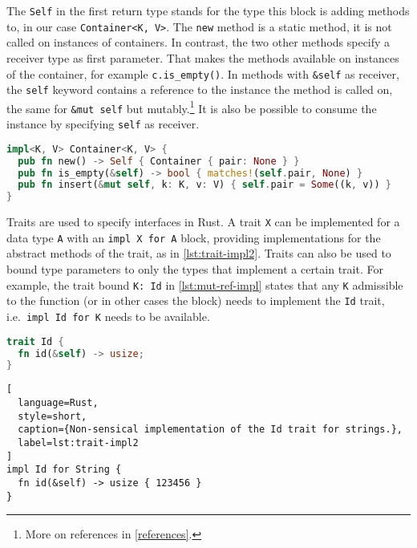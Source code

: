 The \lstinline!Self! in the first return type stands for the type this block is
adding methods to, in our case \lstinline!Container<K, V>!. The \lstinline!new!
method is a static method, it is not called on instances of containers. In
contrast, the two other methods specify a receiver type as first parameter. That
makes the methods available on instances of the container, for example
\lstinline!c.is_empty()!. In methods with \lstinline!&self! as receiver, the
\lstinline!self! keyword  contains a reference to the instance the method is
called on, the same for \lstinline!&mut self! but mutably.\footnote{More on
references in \autoref{references}.} It is also be possible to consume the
instance by specifying \lstinline!self! as receiver.

\begin{lstlisting}[language=Rust, caption={Methods for the running example}, label=lst:impl1]
impl<K, V> Container<K, V> {
  pub fn new() -> Self { Container { pair: None } }
  pub fn is_empty(&self) -> bool { matches!(self.pair, None) }
  pub fn insert(&mut self, k: K, v: V) { self.pair = Some((k, v)) }
}
\end{lstlisting}

Traits are used to specify interfaces in Rust. A trait \lstinline!X! can be
implemented for a data type \lstinline!A! with an \passthrough{\lstinline!impl X
for A!} block, providing implementations for the abstract methods of the trait,
as in \autoref{lst:trait-impl2}. Traits can also be used to bound type
parameters to only the types that implement a certain trait. For example, the
trait bound \lstinline!K: Id!  in \autoref{lst:mut-ref-impl} states that any
\lstinline!K! admissible to the function (or in other cases the block) needs to
implement the \lstinline!Id! trait, i.e.~\passthrough{\lstinline!impl Id for K!}
needs to be available.

\noindent\begin{minipage}[t]{.45\textwidth}
\begin{lstlisting}[language=Rust, style=short, caption={Rust trait with one method.}, label=lst:trait-impl1]
trait Id {
  fn id(&self) -> usize;
}
\end{lstlisting}
\end{minipage}\hfill
\begin{minipage}[t]{.45\textwidth}
\begin{lstlisting}[
  language=Rust,
  style=short,
  caption={Non-sensical implementation of the Id trait for strings.},
  label=lst:trait-impl2
]
impl Id for String {
  fn id(&self) -> usize { 123456 }
}
\end{lstlisting}
\end{minipage}

